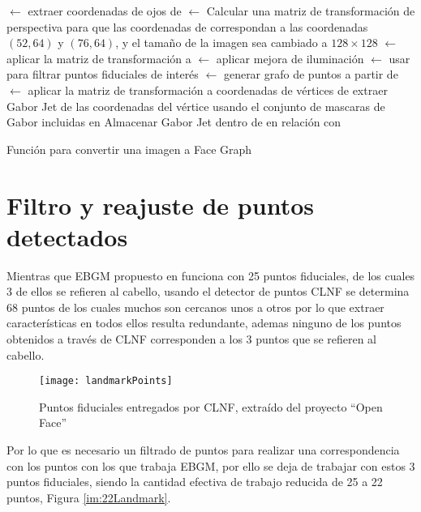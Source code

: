 \begin{algorithm}
\;
{
 $\gets$ extraer coordenadas de ojos de \;
 $\gets$ Calcular una matriz de transformación de perspectiva para que las coordenadas de  correspondan a las coordenadas $(52,64)$ y $(76,64)$,  y el tamaño de la imagen sea cambiado a $128 \times 128$\;
 $\gets$ aplicar la matriz de transformación  a \;
 $\gets$ aplicar mejora de iluminación\;
 $\gets$ usar  para filtrar puntos fiduciales de interés\;
 $\gets$ generar grafo de puntos a partir de \;
 $\gets$ aplicar la matriz de transformación  a coordenadas de vértices de \;
{
	extraer Gabor Jet de las coordenadas del vértice usando el conjunto de mascaras de Gabor incluidas en \;
    Almacenar Gabor Jet dentro de  en relación con \;
}
\Return {}\;
}

\caption{Función para convertir una imagen a Face Graph}
\label{alg:ImToGrph}
\end{algorithm}

\section{Filtro y reajuste de puntos detectados}
Mientras que \ac{EBGM} propuesto en \cite{bolme2003elastic} funciona con 25 puntos fiduciales, de los cuales 3 de ellos se refieren al cabello, usando el detector de puntos \ac{CLNF} se determina 68 puntos de los cuales muchos son cercanos unos a otros por lo que extraer características en todos ellos resulta redundante, ademas ninguno de los puntos obtenidos a través de \ac{CLNF} corresponden a los 3 puntos que se refieren al cabello.

\begin{figure}[h]
\center
\texttt{[image: landmarkPoints]}
\caption{Puntos fiduciales entregados por \ac{CLNF}, extraído del proyecto ``Open Face''}
\label{im:68Landmark}
\end{figure}

Por lo que es necesario un filtrado de puntos para realizar una correspondencia con los puntos con los que trabaja \ac{EBGM}, por ello se deja de trabajar con estos 3 puntos fiduciales, siendo la cantidad efectiva de trabajo reducida de 25 a 22 puntos, Figura \ref{im:22Landmark}.

